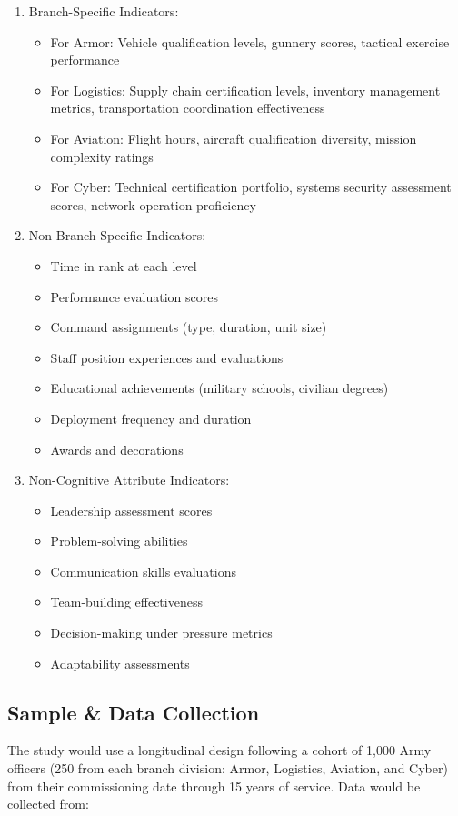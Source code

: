 \documentclass{article}
\begin{document}
\begin{enumerate}
\item Branch-Specific Indicators:
   \begin{itemize}
   \item For Armor: Vehicle qualification levels, gunnery scores, tactical exercise performance
   \item For Logistics: Supply chain certification levels, inventory management metrics, transportation coordination effectiveness
   \item For Aviation: Flight hours, aircraft qualification diversity, mission complexity ratings
   \item For Cyber: Technical certification portfolio, systems security assessment scores, network operation proficiency
   \end{itemize}

\item Non-Branch Specific Indicators:
   \begin{itemize}
   \item Time in rank at each level
   \item Performance evaluation scores
   \item Command assignments (type, duration, unit size)
   \item Staff position experiences and evaluations
   \item Educational achievements (military schools, civilian degrees)
   \item Deployment frequency and duration
   \item Awards and decorations
   \end{itemize}

\item Non-Cognitive Attribute Indicators:
   \begin{itemize}
   \item Leadership assessment scores
   \item Problem-solving abilities
   \item Communication skills evaluations
   \item Team-building effectiveness
   \item Decision-making under pressure metrics
   \item Adaptability assessments
   \end{itemize}
\end{enumerate}

\subsection{Sample \& Data Collection}
The study would use a longitudinal design following a cohort of 1,000 Army officers (250 from each branch division: Armor, Logistics, Aviation, and Cyber) from their commissioning date through 15 years of service. Data would be collected from:
\end{document}
